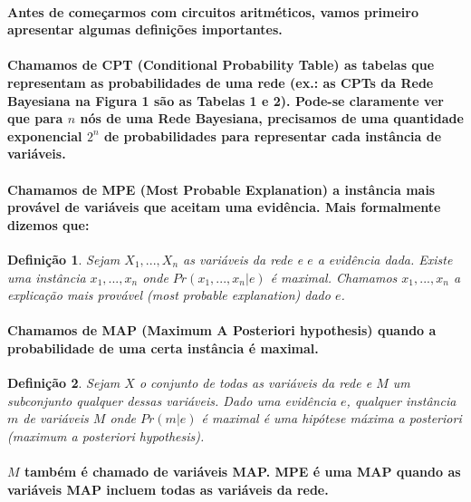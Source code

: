 \documentclass[a4paper,10pt]{article}
\theoremstyle{plain}
\newtheorem*{spn-def}{Definição}
\begin{document}
\paragraph{
  Antes de começarmos com circuitos aritméticos, vamos primeiro apresentar algumas definições
importantes.
}

\paragraph{
  Chamamos de CPT (Conditional Probability Table) as tabelas que representam as
probabilidades de uma rede (ex.: as CPTs da Rede Bayesiana na Figura 1 são as Tabelas 1 e 2).
Pode-se claramente ver que para $n$ nós de uma Rede Bayesiana, precisamos de uma quantidade
exponencial $2^n$ de probabilidades para representar cada instância de variáveis.
}

\paragraph{
  Chamamos de MPE (Most Probable Explanation) a instância mais provável de variáveis que aceitam
uma evidência. Mais formalmente dizemos que:
}

\begin{spn-def} Sejam $X_1,...,X_n$ as variáveis da rede e $e$ a evidência dada. Existe uma
  instância $x_1,...,x_n$ onde $Pr(x_1,...,x_n|e)$ é maximal. Chamamos $x_1,...,x_n$ a 
  \textit{explicação mais provável} (\textit{most probable explanation}) dado $e$.
\end{spn-def}

\paragraph{
  Chamamos de MAP (Maximum A Posteriori hypothesis) quando a probabilidade de uma certa instância
é maximal.
}

\begin{spn-def} Sejam $X$ o conjunto de todas as variáveis da rede e $M$ um subconjunto qualquer
  dessas variáveis. Dado uma evidência $e$, qualquer instância $m$ de variáveis $M$ onde $Pr(m|e)$
  é maximal é uma \textit{hipótese máxima a posteriori} (\textit{maximum a posteriori hypothesis}).
\end{spn-def}

\paragraph{
  $M$ também é chamado de variáveis MAP. MPE é uma MAP quando as variáveis MAP incluem todas as
variáveis da rede.
}
\end{document}

